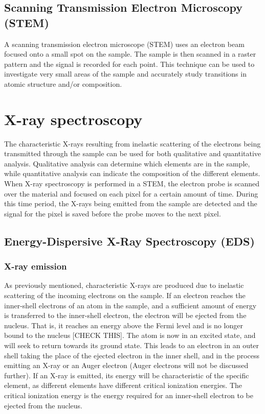 
	\subsection{Scanning Transmission Electron Microscopy (STEM)}
A scanning transmission electron microscope (STEM) uses an electron beam focused onto a small spot on the sample. The sample is then scanned in a raster pattern and the signal is recorded for each point. This technique can be used to investigate very small areas of the sample and accurately study transitions in atomic structure and/or composition.

\section{X-ray spectroscopy}\label{EDS}
The characteristic X-rays resulting from inelastic scattering of the electrons being transmitted through the sample can be used for both qualitative and quantitative analysis. Qualitative analysis can determine which elements are in the sample, while quantitative analysis can indicate the composition of the different elements. When X-ray spectroscopy is performed in a STEM, the electron probe is scanned over the material and focused on each pixel for a certain amount of time. During this time period, the X-rays being emitted from the sample are detected and the signal for the pixel is saved before the probe moves to the next pixel. 

	\subsection{Energy-Dispersive X-Ray Spectroscopy (EDS)} %
		\subsubsection{X-ray emission}
As previously mentioned, characteristic X-rays are produced due to inelastic scattering of the incoming electrons on the sample. If an electron reaches the inner-shell electrons of an atom in the sample, and a sufficient amount of energy is transferred to the inner-shell electron, the electron will be ejected from the nucleus. That is, it reaches an energy above the Fermi level and is no longer bound to the nucleus [CHECK THIS]. The atom is now in an excited state, and will seek to return towards its ground state. This leads to an electron in an outer shell taking the place of the ejected electron in the inner shell, and in the process emitting an X-ray or an Auger electron (Auger electrons will not be discussed further). If an X-ray is emitted, its energy will be characteristic of the specific element, as different elements have different critical ionization energies. The critical ionization energy is the energy required for an inner-shell electron to be ejected from the nucleus.

